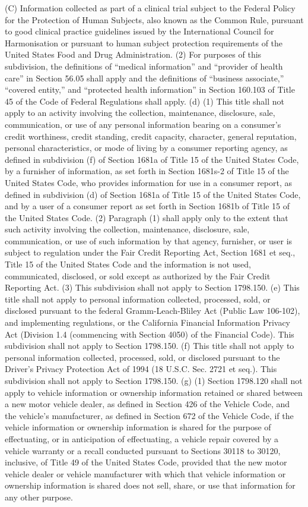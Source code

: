 (C) Information collected as part of a clinical trial subject to the Federal Policy for the Protection of Human Subjects, also known as the Common Rule, pursuant to good clinical practice guidelines issued by the International Council for Harmonisation or pursuant to human subject protection requirements of the United States Food and Drug Administration.
(2) For purposes of this subdivision, the definitions of “medical information” and “provider of health care” in Section 56.05 shall apply and the definitions of “business associate,” “covered entity,” and “protected health information” in Section 160.103 of Title 45 of the Code of Federal Regulations shall apply.
(d) (1) This title shall not apply to an activity involving the collection, maintenance, disclosure, sale, communication, or use of any personal information bearing on a consumer’s credit worthiness, credit standing, credit capacity, character, general reputation, personal characteristics, or mode of living by a consumer reporting agency, as defined in subdivision (f) of Section 1681a of Title 15 of the United States Code, by a furnisher of information, as set forth in Section 1681s-2 of Title 15 of the United States Code, who provides information for use in a consumer report, as defined in subdivision (d) of Section 1681a of Title 15 of the United States Code, and by a user of a consumer report as set forth in Section 1681b of Title 15 of the United States Code.
(2) Paragraph (1) shall apply only to the extent that such activity involving the collection, maintenance, disclosure, sale, communication, or use of such information by that agency, furnisher, or user is subject to regulation under the Fair Credit Reporting Act, Section 1681 et seq., Title 15 of the United States Code and the information is not used, communicated, disclosed, or sold except as authorized by the Fair Credit Reporting Act.
(3) This subdivision shall not apply to Section 1798.150.
(e) This title shall not apply to personal information collected, processed, sold, or disclosed pursuant to the federal Gramm-Leach-Bliley Act (Public Law 106-102), and implementing regulations, or the California Financial Information Privacy Act (Division 1.4 (commencing with Section 4050) of the Financial Code). This subdivision shall not apply to Section 1798.150.
(f) This title shall not apply to personal information collected, processed, sold, or disclosed pursuant to the Driver’s Privacy Protection Act of 1994 (18 U.S.C. Sec. 2721 et seq.). This subdivision shall not apply to Section 1798.150.
(g) (1) Section 1798.120 shall not apply to vehicle information or ownership information retained or shared between a new motor vehicle dealer, as defined in Section 426 of the Vehicle Code, and the vehicle’s manufacturer, as defined in Section 672 of the Vehicle Code, if the vehicle information or ownership information is shared for the purpose of effectuating, or in anticipation of effectuating, a vehicle repair covered by a vehicle warranty or a recall conducted pursuant to Sections 30118 to 30120, inclusive, of Title 49 of the United States Code, provided that the new motor vehicle dealer or vehicle manufacturer with which that vehicle information or ownership information is shared does not sell, share, or use that information for any other purpose.
